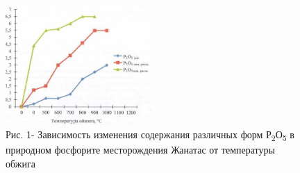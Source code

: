 \begin{figure}[H]
	\centering
	\includegraphics[width=0.5\textwidth]{assets/1082}
	\caption*{Рис. 1- Зависимость изменения содержания различных форм Р\textsubscript{2}О\textsubscript{5} в природном фосфорите месторождения Жанатас от температуры обжига}
\end{figure}


